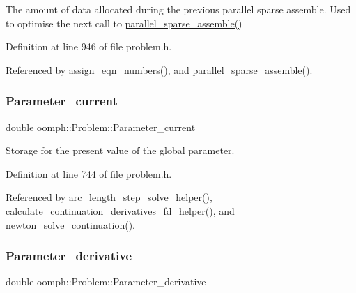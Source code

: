 The amount of data allocated during the previous parallel sparse assemble. Used to optimise the next call to \hyperlink{classoomph_1_1Problem_a0487a7ef40e6cc4dad88e99ac96193e2}{parallel\+\_\+sparse\+\_\+assemble()} 



Definition at line 946 of file problem.\+h.



Referenced by assign\+\_\+eqn\+\_\+numbers(), and parallel\+\_\+sparse\+\_\+assemble().

\mbox{\label{classoomph_1_1Problem_a8e29673eb80559888d1c6148c4f11e57}} 
\subsubsection{\texorpdfstring{Parameter\+\_\+current}{Parameter\_current}}
{\footnotesize\ttfamily double oomph\+::\+Problem\+::\+Parameter\+\_\+current\hspace{0.3cm}{\ttfamily [protected]}}



Storage for the present value of the global parameter. 



Definition at line 744 of file problem.\+h.



Referenced by arc\+\_\+length\+\_\+step\+\_\+solve\+\_\+helper(), calculate\+\_\+continuation\+\_\+derivatives\+\_\+fd\+\_\+helper(), and newton\+\_\+solve\+\_\+continuation().

\mbox{\label{classoomph_1_1Problem_aa5082325ca4cafe5a9ec03ef79c67a6f}} 
\subsubsection{\texorpdfstring{Parameter\+\_\+derivative}{Parameter\_derivative}}
{\footnotesize\ttfamily double oomph\+::\+Problem\+::\+Parameter\+\_\+derivative\hspace{0.3cm}{\ttfamily [protected]}}



